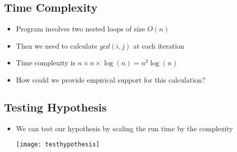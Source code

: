 
\begin{slide}
\section{Time Complexity}

\begin{PauseHighLight}
  \begin{itemize}
  \item Program involves two nested loops of size $O(n)$\pause
  \item Then we need to calculate \jl$gcd(i, j)$ at each iteration\pause
  \item Time complexity is $n \times n \times \log(n) = n^2
    \log(n)$\pause
  \item How could we provide empirical support for this calculation?\pause
  \end{itemize}
\end{PauseHighLight}

\end{slide}


\begin{slide}
\section[-2]{Testing Hypothesis}

\begin{PauseHighLight}
  \begin{itemize}
  \item We can test our hypothesis by scaling the run time by the
    complexity
    \begin{center}
      \texttt{[image: testhypothesis]}
    \end{center}
  \end{itemize}
\end{PauseHighLight}

\end{slide}



